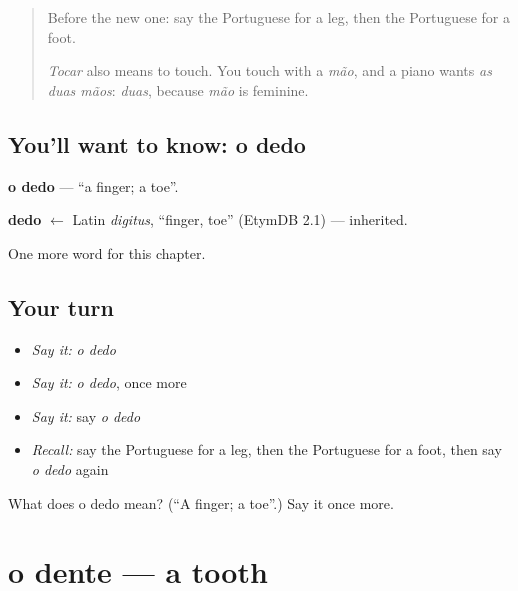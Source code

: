 \label{lesson:PT-C30-dedo}



\begin{quote}
Before the new one: say the Portuguese for a leg, then the Portuguese for a foot.

\emph{Tocar} also means to touch. You touch with a \emph{mão}, and a piano wants \emph{as duas mãos}: \emph{duas}, because \emph{mão} is feminine.
\end{quote}

\subsection*{You'll want to know: o dedo}
\textbf{o dedo} — \textquotedblleft{}a finger; a toe\textquotedblright{}.

\begin{cousinweb}
\textbf{dedo} $\leftarrow$ Latin \emph{digitus}, \textquotedblleft{}finger, toe\textquotedblright{} (EtymDB 2.1) — inherited.
\end{cousinweb}

\begin{grammarlens}[title={What you've built}]
One more word for this chapter.
\end{grammarlens}

\subsection*{Your turn}
\begin{itemize}
\raggedright
  \item \emph{Say it:} \emph{o dedo}
  \item \emph{Say it:} \emph{o dedo}, once more
  \item \emph{Say it:} say \emph{o dedo}
  \item \emph{Recall:} say the Portuguese for a leg, then the Portuguese for a foot, then say \emph{o dedo} again
\end{itemize}

\begin{tcolorbox}[breakable,colback=teal!4,colframe=teal!35!black,title={Before you move on}]
What does o dedo mean? (\textquotedblleft{}A finger; a toe\textquotedblright{}.) Say it once more.
\end{tcolorbox}
\section[o dente]{o dente — a tooth}

